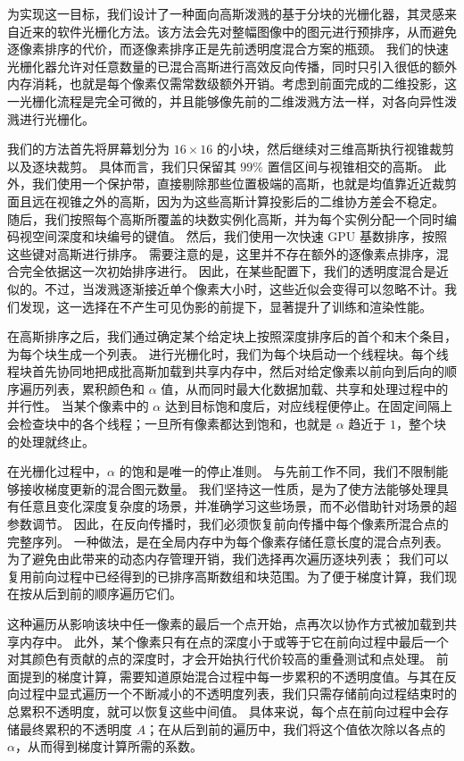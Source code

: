 为实现这一目标，我们设计了一种面向高斯泼溅的基于分块的光栅化器，其灵感来自近来的软件光栅化方法。该方法会先对整幅图像中的图元进行预排序，从而避免逐像素排序的代价，而逐像素排序正是先前透明度混合方案的瓶颈。
我们的快速光栅化器允许对任意数量的已混合高斯进行高效反向传播，同时只引入很低的额外内存消耗，也就是每个像素仅需常数级额外开销。考虑到前面完成的二维投影，这一光栅化流程是完全可微的，并且能够像先前的二维泼溅方法一样，对各向异性泼溅进行光栅化。

我们的方法首先将屏幕划分为 \(16\times16\) 的小块，然后继续对三维高斯执行视锥裁剪以及逐块裁剪。
具体而言，我们只保留其 \(99\%\) 置信区间与视锥相交的高斯。
此外，我们使用一个保护带，直接剔除那些位置极端的高斯，也就是均值靠近近裁剪面且远在视锥之外的高斯，因为为这些高斯计算投影后的二维协方差会不稳定。
随后，我们按照每个高斯所覆盖的块数实例化高斯，并为每个实例分配一个同时编码视空间深度和块编号的键值。
然后，我们使用一次快速 GPU 基数排序，按照这些键对高斯进行排序。
需要注意的是，这里并不存在额外的逐像素点排序，混合完全依据这一次初始排序进行。
因此，在某些配置下，我们的透明度混合是近似的。不过，当泼溅逐渐接近单个像素大小时，这些近似会变得可以忽略不计。我们发现，这一选择在不产生可见伪影的前提下，显著提升了训练和渲染性能。

在高斯排序之后，我们通过确定某个给定块上按照深度排序后的首个和末个条目，为每个块生成一个列表。
进行光栅化时，我们为每个块启动一个线程块。每个线程块首先协同地把成批高斯加载到共享内存中，然后对给定像素以前向到后向的顺序遍历列表，累积颜色和 \(\alpha\) 值，从而同时最大化数据加载、共享和处理过程中的并行性。
当某个像素中的 \(\alpha\) 达到目标饱和度后，对应线程便停止。在固定间隔上会检查块中的各个线程；一旦所有像素都达到饱和，也就是 \(\alpha\) 趋近于 \(1\)，整个块的处理就终止。

在光栅化过程中，\(\alpha\) 的饱和是唯一的停止准则。
与先前工作不同，我们不限制能够接收梯度更新的混合图元数量。
我们坚持这一性质，是为了使方法能够处理具有任意且变化深度复杂度的场景，并准确学习这些场景，而不必借助针对场景的超参数调节。
因此，在反向传播时，我们必须恢复前向传播中每个像素所混合点的完整序列。
一种做法，是在全局内存中为每个像素存储任意长度的混合点列表。为了避免由此带来的动态内存管理开销，我们选择再次遍历逐块列表；
我们可以复用前向过程中已经得到的已排序高斯数组和块范围。为了便于梯度计算，我们现在按从后到前的顺序遍历它们。

这种遍历从影响该块中任一像素的最后一个点开始，点再次以协作方式被加载到共享内存中。
此外，某个像素只有在点的深度小于或等于它在前向过程中最后一个对其颜色有贡献的点的深度时，才会开始执行代价较高的重叠测试和点处理。
前面提到的梯度计算，需要知道原始混合过程中每一步累积的不透明度值。与其在反向过程中显式遍历一个不断减小的不透明度列表，我们只需存储前向过程结束时的总累积不透明度，就可以恢复这些中间值。
具体来说，每个点在前向过程中会存储最终累积的不透明度 \(A\)；在从后到前的遍历中，我们将这个值依次除以各点的 \(\alpha\)，从而得到梯度计算所需的系数。

